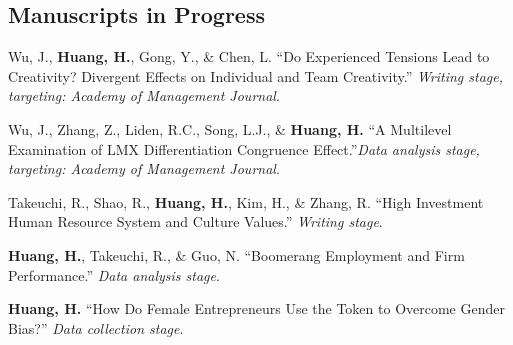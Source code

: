 \documentclass[12pt,letterpaper]{report} %
\begin{document}
   \subsection*{Manuscripts in Progress}
    \begin{tablist}

            
        \item[]\tab{}Wu, J., \textbf{Huang, H.}, Gong, Y., \& Chen, L. \enquote{Do Experienced Tensions Lead to Creativity? Divergent Effects on Individual and Team Creativity.} \textit{Writing stage, targeting: Academy of Management Journal}.

        \item[]\tab{}Wu, J., Zhang, Z., Liden, R.C., Song, L.J., \& \textbf{Huang, H.} \enquote{A Multilevel Examination of LMX Differentiation Congruence Effect.}\textit{Data analysis stage, targeting: Academy of Management Journal}.

        \item[]\tab{}Takeuchi, R., Shao, R., \textbf{Huang, H.}, Kim, H., \& Zhang, R. \enquote{High Investment Human Resource System and Culture Values.}  \textit{Writing stage}.
        
        \item[]\tab{}\textbf{Huang, H.}, Takeuchi, R., \& Guo, N. \enquote{Boomerang Employment and Firm Performance.} \textit{Data analysis stage}.
        
        \item[]\tab{}\textbf{Huang, H.} \enquote{How Do Female Entrepreneurs Use the Token to Overcome Gender Bias?} \textit{Data collection stage}.
        
    \end{tablist}




\end{document}

